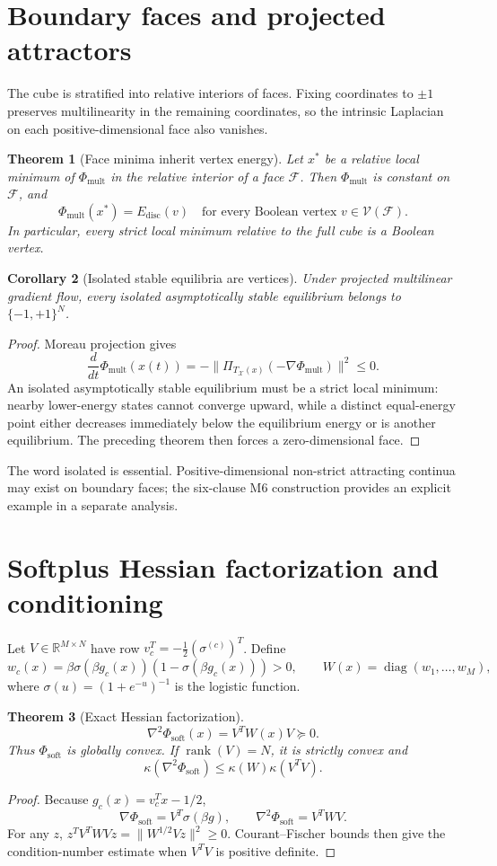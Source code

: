 \documentclass[11pt,a4paper]{article}
\newtheorem{theorem}{Theorem}[section]
\newtheorem{corollary}[theorem]{Corollary}
\begin{document}
\section{Boundary faces and projected attractors}
The cube is stratified into relative interiors of faces. Fixing coordinates to $\pm1$ preserves multilinearity in the remaining coordinates, so the intrinsic Laplacian on each positive-dimensional face also vanishes.
\begin{theorem}[Face minima inherit vertex energy]
Let $x^*$ be a relative local minimum of $\Phi_{\mathrm{mult}}$ in the relative interior of a face $\mathcal F$. Then $\Phi_{\mathrm{mult}}$ is constant on $\mathcal F$, and
\[
\Phi_{\mathrm{mult}}(x^*)=E_{\mathrm{disc}}(v)\quad\text{for every Boolean vertex }v\in\mathcal V(\mathcal F).
\]
In particular, every strict local minimum relative to the full cube is a Boolean vertex.
\end{theorem}
\begin{corollary}[Isolated stable equilibria are vertices]
Under projected multilinear gradient flow, every isolated asymptotically stable equilibrium belongs to $\{-1,+1\}^N$.
\end{corollary}
\begin{proof}
Moreau projection gives
\[
\frac{d}{dt}\Phi_{\mathrm{mult}}(x(t))=-\|\Pi_{T_{\mathcal X}(x)}(-\nabla\Phi_{\mathrm{mult}})\|^2\le0.
\]
An isolated asymptotically stable equilibrium must be a strict local minimum: nearby lower-energy states cannot converge upward, while a distinct equal-energy point either decreases immediately below the equilibrium energy or is another equilibrium. The preceding theorem then forces a zero-dimensional face.
\end{proof}
The word isolated is essential. Positive-dimensional non-strict attracting continua may exist on boundary faces; the six-clause M6 construction provides an explicit example in a separate analysis.
\section{Softplus Hessian factorization and conditioning}
Let $V\in\mathbb R^{M\times N}$ have row $v_c^T=-\frac12(\sigma^{(c)})^T$. Define
\[
w_c(x)=\beta\sigma(\beta g_c(x))(1-\sigma(\beta g_c(x)))>0,\qquad W(x)=\operatorname{diag}(w_1,\ldots,w_M),
\]
where $\sigma(u)=(1+e^{-u})^{-1}$ is the logistic function.
\begin{theorem}[Exact Hessian factorization]
\[
\nabla^2\Phi_{\mathrm{soft}}(x)=V^TW(x)V\succeq0.
\]
Thus $\Phi_{\mathrm{soft}}$ is globally convex. If $\operatorname{rank}(V)=N$, it is strictly convex and
\[
\kappa(\nabla^2\Phi_{\mathrm{soft}})\le\kappa(W)\kappa(V^TV).
\]
\end{theorem}
\begin{proof}
Because $g_c(x)=v_c^Tx-1/2$,
\[
\nabla\Phi_{\mathrm{soft}}=V^T\sigma(\beta g),\qquad \nabla^2\Phi_{\mathrm{soft}}=V^TWV.
\]
For any $z$, $z^TV^TWVz=\|W^{1/2}Vz\|^2\ge0$. Courant--Fischer bounds then give the condition-number estimate when $V^TV$ is positive definite.
\end{proof}
\end{document}
